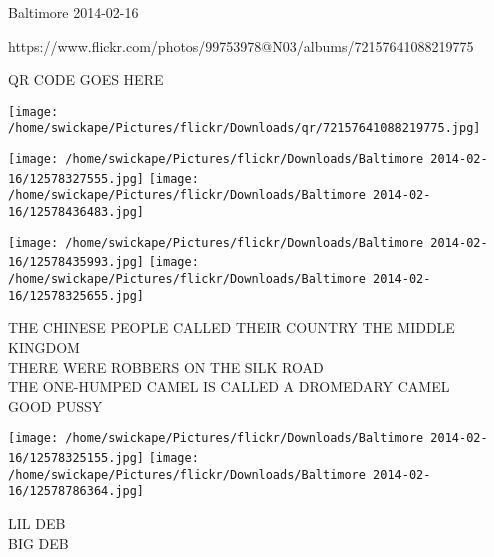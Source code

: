 \documentclass[10pt,letterpaper]{article}
\begin{document}
Baltimore 2014-02-16

https://www.flickr.com/photos/99753978@N03/albums/72157641088219775

QR CODE GOES HERE

\texttt{[image: /home/swickape/Pictures/flickr/Downloads/qr/72157641088219775.jpg]}
\pagebreak

\texttt{[image: /home/swickape/Pictures/flickr/Downloads/Baltimore 2014-02-16/12578327555.jpg]}
\texttt{[image: /home/swickape/Pictures/flickr/Downloads/Baltimore 2014-02-16/12578436483.jpg]}

\texttt{[image: /home/swickape/Pictures/flickr/Downloads/Baltimore 2014-02-16/12578435993.jpg]}
\texttt{[image: /home/swickape/Pictures/flickr/Downloads/Baltimore 2014-02-16/12578325655.jpg]}

THE CHINESE PEOPLE CALLED THEIR COUNTRY THE MIDDLE KINGDOM\\
THERE WERE ROBBERS ON THE SILK ROAD\\
THE ONE{-}HUMPED CAMEL IS CALLED A DROMEDARY CAMEL\\
GOOD PUSSY\\
\pagebreak

\texttt{[image: /home/swickape/Pictures/flickr/Downloads/Baltimore 2014-02-16/12578325155.jpg]}
\texttt{[image: /home/swickape/Pictures/flickr/Downloads/Baltimore 2014-02-16/12578786364.jpg]}

LIL DEB\\
BIG DEB\\
\pagebreak
\end{document}
